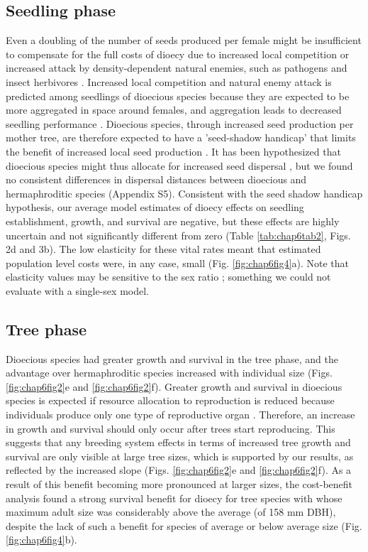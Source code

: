 \documentclass[b5paper,justified]{tufte-book} %
\begin{document}
\begin{fullwidth}
\subsection{Seedling phase}
Even a doubling of the number of seeds produced per female might be insufficient to compensate for the full costs of dioecy due to increased local competition or increased attack by density-dependent natural enemies, such as pathogens and insect herbivores \citep{Heilbuth2001, Barot2004}. Increased local competition and natural enemy attack is predicted among seedlings of dioecious species because they are expected to be more aggregated in space around females, and aggregation leads to decreased seedling performance \citep{Harms2000a, Comita2014, Lebrija-Trejos2014}. Dioecious species, through increased seed production per mother tree, are therefore expected to have a 'seed-shadow handicap' that limits the benefit of increased local seed production \citep{Heilbuth2001, Barot2004}. It has been hypothesized that dioecious species might thus allocate for increased seed dispersal \citep{Heilbuth2001}, but we found no consistent differences in dispersal distances between dioecious and hermaphroditic species (Appendix S5).  Consistent with the seed shadow handicap hypothesis, our average model estimates of dioecy effects on seedling establishment, growth, and survival are negative, but these effects are highly uncertain and not significantly different from zero (Table \ref{tab:chap6tab2}, Figs. 2d and 3b). The low elasticity for these vital rates meant that estimated population level costs were, in any case, small (Fig. \ref{fig:chap6fig4}a). Note that elasticity values may be sensitive to the sex ratio \citep{Haridas2014}; something we could not evaluate with a single-sex model.

\subsection{Tree phase}
Dioecious species had greater growth and survival in the tree phase, and the advantage over hermaphroditic species increased with individual size (Figs. \ref{fig:chap6fig2}e and \ref{fig:chap6fig2}f). Greater growth and survival in dioecious species is expected if resource allocation to reproduction is reduced because individuals produce only one type of reproductive organ \citep{Bawa1980}. Therefore, an increase in growth and survival should only occur after trees start reproducing. This suggests that any breeding system effects in terms of increased tree growth and survival are only visible at large tree sizes, which is supported by our results, as reflected by the increased slope (Figs. \ref{fig:chap6fig2}e and \ref{fig:chap6fig2}f). As a result of this benefit becoming more pronounced at larger sizes, the cost-benefit analysis found a strong survival benefit for dioecy for tree species with whose maximum adult size was considerably above the average (of 158 mm DBH), despite the lack of such a benefit for species of average or below average size (Fig. \ref{fig:chap6fig4}b).


\end{fullwidth}
\end{document}
